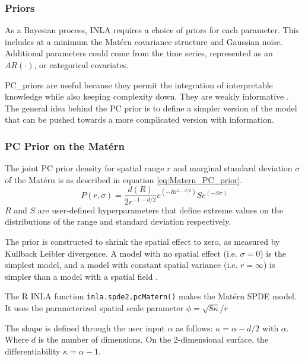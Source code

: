 \documentclass{article}
\begin{document}
\subsubsection*{Priors} \label{subsubsec:Priors}
As a Bayesian process, \ac{INLA} requires a choice of priors for each parameter.  This includes at a minimum the  Mat\'{e}rn covariance structure and Gaussian noise.  Additional parameters could come from the time series, represented as an $AR(\cdot)$, or categorical covariates.

\Gls{PC_priors} are useful because they permit the integration of interpretable knowledge while also keeping complexity down.  They are weakly informative  \citep{fuglstad2017constructing, simpson2017penalising}.
The general idea behind the PC prior is to define a simpler version of the model that can be pushed towards a more complicated version with information.   


\subsubsection*{PC Prior on the Mat\'{e}rn}
\label{subsubsec:pcprioronmatern}
The joint PC prior density for spatial range $r$ and marginal standard deviation $\sigma$ of the Mat\'{e}rn is as described in equation \ref{eq:Matern_PC_prior}.
\begin{equation} \label{eq:Matern_PC_prior}
    P(r, \sigma) = \frac{d(R)}{2 r^{-1-d/2}} e^{(-R r  ^{2 -d/2})} S e^{(-S \sigma)}
\end{equation}
$R$ and $S$ are user-defined hyperparameters that define extreme values on the distributions of the range and standard deviation respectively.

The prior is constructed to shrink the spatial effect to zero, as measured by Kullback Leibler divergence.  A model with no spatial effect (i.e. $\sigma = 0$) is the simplest model, and a model with constant spatial variance (i.e. $r = \infty$)  is simpler than a model with a spatial field \citep{fuglstad2017constructing}.

The R \ac{INLA} function \verb|inla.spde2.pcMatern()| makes the Mat\'{e}rn \ac{SPDE} model.  It uses the parameterized spatial scale parameter $\phi = \sqrt{8\kappa}/r$


The shape is defined through the user input $\alpha$ as follows:  $\kappa = \alpha -d/2$ with $\alpha$.  Where $d$ is the number of dimensions.  On the 2-dimensional surface, the differentiability $\kappa = \alpha -1$.


\end{document}
